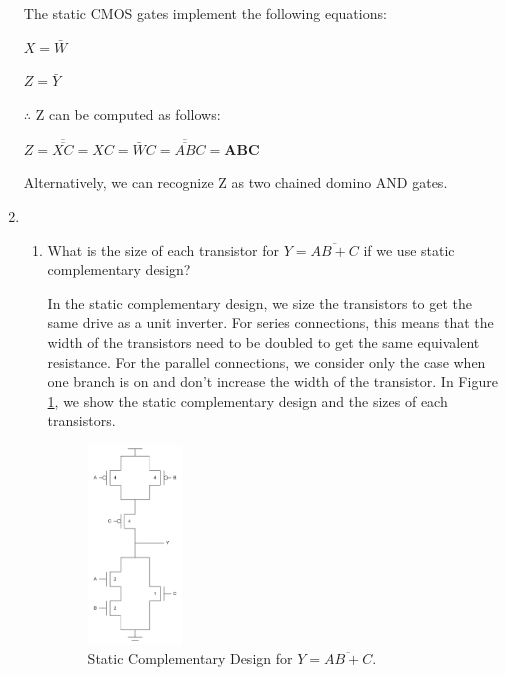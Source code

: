 \documentclass[fleqn]{article}
\begin{document}
\begin{enumerate}
			The static CMOS gates implement the following equations:
			
			$X = \bar{W}$
			
			$Z = \bar{Y}$
			
			$\therefore$ Z can be computed as follows:
			
			$Z = \overline{\overline{XC}} = XC = \bar{W}C = \overline{\overline{AB}}C = \mathbf{ABC}$
			
			Alternatively, we can recognize Z as two chained domino AND gates.
			
		\item ~
		
			\begin{enumerate}
			
			\item[1.] What is the size of each transistor for $Y = \overline{AB + C}$ if we use static complementary design?
			
			In the static complementary design, we size the transistors to get the same drive as a unit inverter. For series connections, this means that the width of the transistors need to be doubled to get the same equivalent resistance. For the parallel connections, we consider only the case when one branch is on and don't increase the width of the transistor. In Figure \ref{fig::circuit4a}, we show the static complementary design and the sizes of each transistors.
			
			\begin{figure}[H]
				\centerline{\includegraphics[width=0.25\textwidth]{circuit4a.png}}
				\caption{Static Complementary Design for $Y = \overline{AB + C}$.}
				\label{fig::circuit4a}
			\end{figure}
			
			\end{enumerate}			 
	\end{enumerate}
\end{document}
